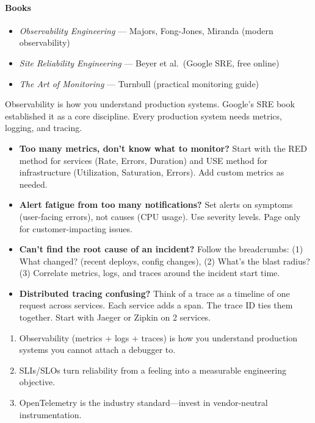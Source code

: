 \documentclass[11pt, a4paper, oneside]{report}
\begin{document}
\paragraph{Books}
\begin{itemize}[leftmargin=*]
\item \emph{Observability Engineering} --- Majors, Fong-Jones, Miranda (modern observability)
\item \emph{Site Reliability Engineering} --- Beyer et al.\ (Google SRE, free online)
\item \emph{The Art of Monitoring} --- Turnbull (practical monitoring guide)
\end{itemize}


\begin{realworldbox}
Observability is how you understand production systems. Google's SRE book established it as a core discipline. Every production system needs metrics, logging, and tracing.
\end{realworldbox}


\begin{stuckbox}
\begin{itemize}[leftmargin=*]
\item \textbf{Too many metrics, don't know what to monitor?} Start with the RED method for services (Rate, Errors, Duration) and USE method for infrastructure (Utilization, Saturation, Errors). Add custom metrics as needed.
\item \textbf{Alert fatigue from too many notifications?} Set alerts on symptoms (user-facing errors), not causes (CPU usage). Use severity levels. Page only for customer-impacting issues.
\item \textbf{Can't find the root cause of an incident?} Follow the breadcrumbs: (1) What changed? (recent deploys, config changes), (2) What's the blast radius? (3) Correlate metrics, logs, and traces around the incident start time.
\item \textbf{Distributed tracing confusing?} Think of a trace as a timeline of one request across services. Each service adds a span. The trace ID ties them together. Start with Jaeger or Zipkin on 2 services.
\end{itemize}
\end{stuckbox}


\begin{takeawaybox}
\begin{enumerate}[leftmargin=*]
\item Observability (metrics + logs + traces) is how you understand production systems you cannot attach a debugger to.
\item SLIs/SLOs turn reliability from a feeling into a measurable engineering objective.
\item OpenTelemetry is the industry standard---invest in vendor-neutral instrumentation.
\end{enumerate}
\end{takeawaybox}
\end{document}
